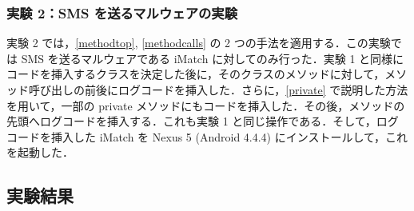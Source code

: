 \subsubsection{実験 2：SMS  を送るマルウェアの実験}
\label{exp2}
実験 2 では，\ref{methodtop}, \ref{methodcalls} の 2 つの手法を適用する．この実験では SMS を送るマルウェアである iMatch に対してのみ行った．実験 1 と同様にコードを挿入するクラスを決定した後に，そのクラスのメソッドに対して，メソッド呼び出しの前後にログコードを挿入した．さらに，\ref{private} で説明した方法を用いて，一部の private メソッドにもコードを挿入した．その後，メソッドの先頭へログコードを挿入する．これも実験 1 と同じ操作である．そして，ログコードを挿入した iMatch を Nexus 5 (Android 4.4.4) にインストールして，これを起動した．

\subsection{実験結果}
